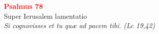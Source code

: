 


\def\greinitialformat#1{%
{\fontsize{39}{39}\selectfont #1}%
}




\vspace{0.3cm}
\begin{center}
 \textcolor{red}{\large \bf Psalmus 78}\\
Super Ierusalem lamentatio\\
\textit{\small Si cognovisses et tu quæ ad pacem tibi. (Lc 19,42)}
\end{center}
